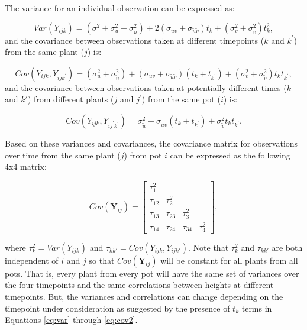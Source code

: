 \documentclass[
]{krantz}
\begin{document}
The variance for an individual observation can be expressed as:

\begin{equation}
Var(Y_{ijk}) = (\sigma^{2} + \sigma_{u}^{2} + \sigma_{\tilde{u}}^{2}) + 2(\sigma_{uv} + \sigma_{\tilde{u}\tilde{v}})t_k + (\sigma_{v}^{2} + \sigma_{\tilde{v}}^{2})t_{k}^{2},
\label{eq:var}
\end{equation}
and the covariance between observations taken at different timepoints (\(k\) and \(k^{'}\)) from the same plant (\(j\)) is:

\begin{equation}
Cov(Y_{ijk},Y_{ijk^{'}}) = (\sigma_{u}^{2} + \sigma_{\tilde{u}}^{2}) + (\sigma_{uv} + \sigma_{\tilde{u}\tilde{v}})(t_{k}+t_{k^{'}}) + 
(\sigma_{v}^{2} + \sigma_{\tilde{v}}^{2})t_{k}t_{k^{'}},
\label{eq:cov1}
\end{equation}
and the covariance between observations taken at potentially different times (\(k\) and \(k'\)) from different plants (\(j\) and \(j^{'}\)) from the same pot (\(i\)) is:

\begin{equation}
Cov(Y_{ijk},Y_{ij^{'}k^{'}}) = \sigma_{\tilde{u}}^{2} + \sigma_{\tilde{u}\tilde{v}}(t_{k}+t_{k^{'}}) + \sigma_{\tilde{v}}^{2}t_{k}t_{k^{'}}.
\label{eq:cov2}
\end{equation}

Based on these variances and covariances, the covariance matrix for observations over time from the same plant (\(j\)) from pot \(i\) can be expressed as the following 4x4 matrix:

\[  Cov(\textbf{Y}_{ij}) = \left[
          \begin{array}{cccc}
            \tau_{1}^{2} & & & \\
            \tau_{12} & \tau_{2}^{2} & & \\
            \tau_{13} & \tau_{23} & \tau_{3}^{2} & \\
            \tau_{14} & \tau_{24} & \tau_{34} & \tau_{4}^{2}
          \end{array} \right], \]

where \(\tau_{k}^{2}=Var(Y_{ijk})\) and \(\tau_{kk'}=Cov(Y_{ijk},Y_{ijk'})\). Note that \(\tau_{k}^{2}\) and \(\tau_{kk'}\) are both independent of \(i\) and \(j\) so that \(Cov(\textbf{Y}_{ij})\) will be constant for all plants from all pots. That is, every plant from every pot will have the same set of variances over the four timepoints and the same correlations between heights at different timepoints. But, the variances and correlations can change depending on the timepoint under consideration as suggested by the presence of \(t_k\) terms in Equations \eqref{eq:var} through \eqref{eq:cov2}.
\end{document}
